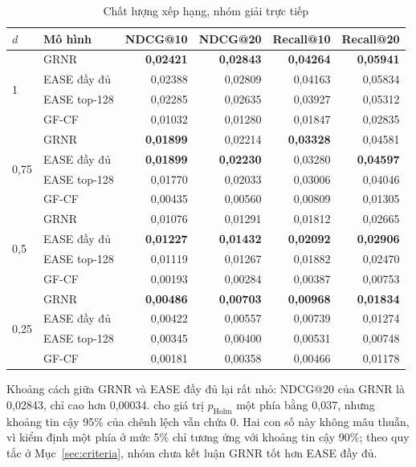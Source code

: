 \begin{table}[H]
\centering
\footnotesize
\renewcommand{\arraystretch}{0.95}
\begin{tabular}{@{}llrrrr@{}}
\toprule
$d$ & Mô hình & NDCG@10 & NDCG@20 & Recall@10 & Recall@20 \\
\midrule
\multirow{4}{*}{1} & GRNR & \textbf{0,02421} & \textbf{0,02843} & \textbf{0,04264} & \textbf{0,05941} \\
 & EASE đầy đủ & 0,02388 & 0,02809 & 0,04163 & 0,05834 \\
 & EASE top-128 & 0,02285 & 0,02635 & 0,03927 & 0,05312 \\
 & GF-CF & 0,01032 & 0,01280 & 0,01847 & 0,02835 \\
\midrule
\multirow{4}{*}{0,75} & GRNR & \textbf{0,01899} & 0,02214 & \textbf{0,03328} & 0,04581 \\
 & EASE đầy đủ & \textbf{0,01899} & \textbf{0,02230} & 0,03280 & \textbf{0,04597} \\
 & EASE top-128 & 0,01770 & 0,02033 & 0,03006 & 0,04046 \\
 & GF-CF & 0,00435 & 0,00560 & 0,00809 & 0,01305 \\
\midrule
\multirow{4}{*}{0,5} & GRNR & 0,01076 & 0,01291 & 0,01812 & 0,02665 \\
 & EASE đầy đủ & \textbf{0,01227} & \textbf{0,01432} & \textbf{0,02092} & \textbf{0,02906} \\
 & EASE top-128 & 0,01119 & 0,01267 & 0,01882 & 0,02470 \\
 & GF-CF & 0,00193 & 0,00284 & 0,00387 & 0,00753 \\
\midrule
\multirow{4}{*}{0,25} & GRNR & \textbf{0,00486} & \textbf{0,00703} & \textbf{0,00968} & \textbf{0,01834} \\
 & EASE đầy đủ & 0,00422 & 0,00557 & 0,00739 & 0,01274 \\
 & EASE top-128 & 0,00345 & 0,00400 & 0,00531 & 0,00748 \\
 & GF-CF & 0,00181 & 0,00358 & 0,00466 & 0,01178 \\
\bottomrule
\end{tabular}
\caption{Chất lượng xếp hạng, nhóm giải trực tiếp}
\label{tab:closed-form}
\end{table}

Khoảng cách giữa GRNR và EASE đầy đủ lại rất nhỏ: NDCG@20 của GRNR là 0,02843, chỉ cao hơn 0,00034.  cho giá trị $p_{\mathrm{Holm}}$ một phía bằng 0,037, nhưng khoảng tin cậy 95\% của chênh lệch vẫn chứa 0. Hai con số này không mâu thuẫn, vì kiểm định một phía ở mức 5\% chỉ tương ứng với khoảng tin cậy 90\%; theo quy tắc ở Mục~\ref{sec:criteria}, nhóm chưa kết luận GRNR tốt hơn EASE đầy đủ.

